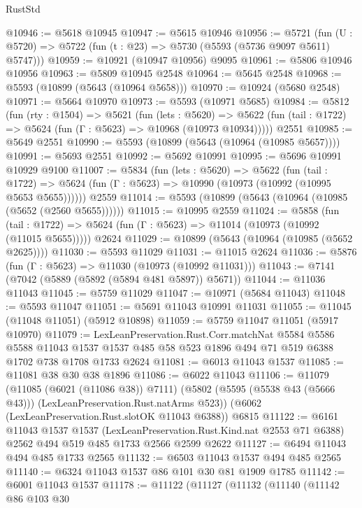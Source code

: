 \begin{lexlean}{RustStd}
\begin{coremodule}
@10946 := @5618 @10945
@10947 := @5615 @10946
@10956 := @5721
    (fun (U : @5720) => @5722 (fun (t : @23) => @5730 (@5593 (@5736 @9097 @5611) @5747)))
@10959 := @10921 (@10947 @10956) @9095
@10961 := @5806 @10946 @10956
@10963 := @5809 @10945 @2548
@10964 := @5645 @2548
@10968 := @5593 (@10899 (@5643 (@10964 @5658)))
@10970 := @10924 (@5680 @2548)
@10971 := @5664 @10970
@10973 := @5593 (@10971 @5685)
@10984 := @5812
    (fun (rty : @1504) =>
    @5621
      (fun (lets : @5620) =>
      @5622 (fun (tail : @1722) => @5624 (fun (Γ : @5623) => @10968 (@10973 @10934)))))
    @2551
@10985 := @5649 @2551
@10990 := @5593 (@10899 (@5643 (@10964 (@10985 @5657))))
@10991 := @5693 @2551
@10992 := @5692 @10991
@10995 := @5696 @10991 @10929 @9100
@11007 := @5834
    (fun (lets : @5620) =>
    @5622
      (fun (tail : @1722) =>
      @5624 (fun (Γ : @5623) => @10990 (@10973 (@10992 (@10995 @5653 @5655))))))
    @2559
@11014 := @5593 (@10899 (@5643 (@10964 (@10985 (@5652 (@2560 @5655))))))
@11015 := @10995 @2559
@11024 := @5858
    (fun (tail : @1722) => @5624 (fun (Γ : @5623) => @11014 (@10973 (@10992 (@11015 @5655)))))
    @2624
@11029 := @10899 (@5643 (@10964 (@10985 (@5652 @2625))))
@11030 := @5593 @11029
@11031 := @11015 @2624
@11036 := @5876 (fun (Γ : @5623) => @11030 (@10973 (@10992 @11031)))
@11043 := @7141 (@7042 (@5889 (@5892 (@5894 @481 @5897)) @5671))
@11044 := @11036 @11043
@11045 := @5759 @11029
@11047 := @10971 (@5684 @11043)
@11048 := @5593 @11047
@11051 := @5691 @11043 @10991 @11031
@11055 := @11045 (@11048 @11051) (@5912 @10898)
@11059 := @5759 @11047 @11051 (@5917 @10970)
@11079 := LexLeanPreservation.Rust.Corr.matchNat
    @5584
    @5586
    @5588
    @11043
    @1537
    @1537
    @485
    @58
    @523
    @1896
    @494
    @71
    @519
    @6388
    @1702
    @738
    @1708
    @1733
    @2624
@11081 := @6013 @11043 @1537
@11085 := @11081 @38 @30 @38 @1896
@11086 := @6022 @11043
@11106 := @11079
    (@11085 (@6021 (@11086 @38)) @7111)
    (@5802 (@5595 (@5538 @43 (@5666 @43))) (LexLeanPreservation.Rust.natArms @523))
    (@6062 (LexLeanPreservation.Rust.slotOK @11043 @6388))
    @6815
@11122 := @6161
    @11043
    @1537
    @1537
    (LexLeanPreservation.Rust.Kind.nat @2553 @71 @6388)
    @2562
    @494
    @519
    @485
    @1733
    @2566
    @2599
    @2622
@11127 := @6494 @11043 @494 @485 @1733 @2565
@11132 := @6503 @11043 @1537 @494 @485 @2565
@11140 := @6324 @11043 @1537 @86 @101 @30 @81 @1909 @1785
@11142 := @6001 @11043 @1537
@11178 := @11122
    (@11127
      (@11132
        (@11140
          (@11142
            @86
            @103
            @30

\end{coremodule}
\end{lexlean}
